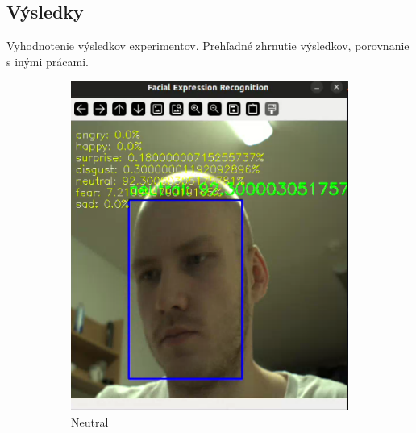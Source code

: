 \subsection{Výsledky} Vyhodnotenie výsledkov experimentov. Prehľadné zhrnutie výsledkov, porovnanie s inými prácami.
\begin{figure}[!htpb]
    \centering
    \begin{subfigure}[b]{0.45\textwidth}
        \centering
        \includegraphics[width=\textwidth]{img/neutral.png}
        \caption{Neutral}
        \label{fig:neutral}
    \end{subfigure}
    \hfill
    \begin{subfigure}[b]{0.45\textwidth}
        \centering

\end{subfigure}
\end{figure}
